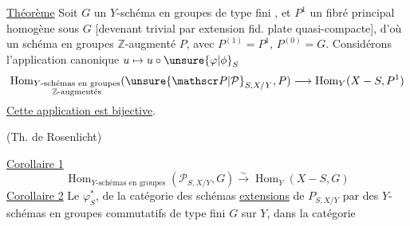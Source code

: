 \uline{Théorème} Soit $G$ un $Y$-schéma en groupes  de type fini , et $P^1$ un fibré principal homogène sous $G$ [devenant trivial par extension fid. plate quasi-compacte\unsure{---}], d’où un schéma en groupes $\mathbb Z$-augmenté $P$, avec $P^{(1)}=P^1$, $P^{(0)}=G$. Considérons l’application canonique $u\mapsto u\circ\unsure{\varphi|\phi}_S$
\[
\operatorname{Hom}_{\substack{Y\text{-schémas en groupes}\\\mathbb Z\text{-augmentés}}}
(\unsure{\mathscr P|\mathcal P}_{S,X/Y},P)\longrightarrow\operatorname{Hom}_Y(X-S,P^1)
\]
\uline{Cette application est bijective}.

(Th. de Rosenlicht)

\uline{Corollaire 1}
\[
\operatorname{Hom}_{Y\text{-schémas en groupes}}(\mathscr P_{S,X/Y},G)\xrightarrow{\sim}\operatorname{Hom}_Y(X-S,G)
\]
\uline{Corollaire 2}  Le   $\varphi_S^*$, de la catégorie des schémas \uline{extensions}  de $P_{S,X/Y}$ par des $Y$-schémas en groupes commutatifs de type fini $G$ sur $Y$, dans la catégorie 
